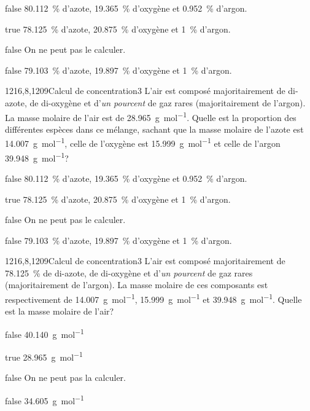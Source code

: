         \begin{reponses}
            \item[false] \SI{80.112}{\percent} d'azote, \SI{19.365}{\percent} d'oxygène et \SI{0.952}{\percent} d'argon.
		    \item[true] \SI{78.125}{\percent} d'azote, \SI{20.875}{\percent} d'oxygène et \SI{1}{\percent} d'argon.
		    \item[false] On ne peut pas le calculer.
		    \item[false] \SI{79.103}{\percent} d'azote, \SI{19.897}{\percent} d'oxygène et \SI{1}{\percent} d'argon.
        \end{reponses}
		\begin{question}{1216,8,1209}{Calcul de concentration}{3}{}
            L'air est composé majoritairement de di-azote, de di-oxygène et d'\emph{un pourcent} de gaz rares (majoritairement de l'argon). La masse molaire de l'air est de \SI{28.965}{\gram\per\mol}. Quelle est la proportion des différentes espèces dans ce mélange, sachant que la masse molaire de l'azote est \SI{14.007}{\gram\per\mol}, celle de l'oxygène est \SI{15.999}{\gram\per\mol} et celle de l'argon \SI{39.948}{\gram\per\mol}?
        \end{question}
        \begin{reponses}
            \item[false] \SI{80.112}{\percent} d'azote, \SI{19.365}{\percent} d'oxygène et \SI{0.952}{\percent} d'argon.
		    \item[true] \SI{78.125}{\percent} d'azote, \SI{20.875}{\percent} d'oxygène et \SI{1}{\percent} d'argon.
		    \item[false] On ne peut pas le calculer.
		    \item[false] \SI{79.103}{\percent} d'azote, \SI{19.897}{\percent} d'oxygène et \SI{1}{\percent} d'argon.
        \end{reponses}
		\begin{question}{1216,8,1209}{Calcul de concentration}{3}{}
            L'air est composé majoritairement de \SI{78.125}{\percent} de di-azote, de di-oxygène et d'\emph{un pourcent} de gaz rares (majoritairement de l'argon). La masse molaire de ces composants est respectivement de \SI{14.007}{\gram\per\mol}, \SI{15.999}{\gram\per\mol} et \SI{39.948}{\gram\per\mol}. Quelle est la masse molaire de l'air?
        \end{question}
        \begin{reponses}
            \item[false] \SI{40.140}{\gram\per\mol}
		    \item[true] \SI{28.965}{\gram\per\mol}
		    \item[false] On ne peut pas la calculer.
		    \item[false] \SI{34.605}{\gram\per\mol}
        \end{reponses}
